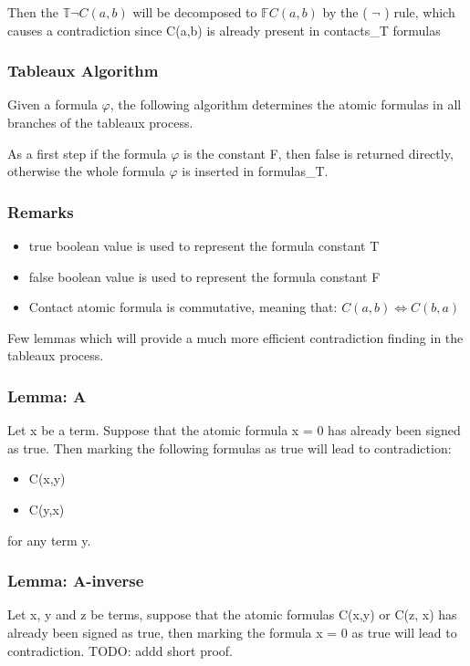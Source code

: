 \documentclass{article}
\begin{document}
			Then the $\mathbb{T}\neg C(a,b)$ will be decomposed to $\mathbb{F} C(a,b)$ by the ( $\neg$ ) rule, which causes a contradiction
			since C(a,b) is already present in contacts\_T formulas

		\subsubsection*{Tableaux Algorithm}
			Given a formula $\varphi$, the following algorithm determines the atomic formulas in all branches of the tableaux process.

			As a first step if the formula $\varphi$ is the constant F, then false is returned directly, otherwise the whole formula $\varphi$ is inserted in formulas\_T.
		\newline
			\subsubsection*{Remarks}
			\begin{itemize}
				\item true boolean value is used to represent the formula constant T
				\item false boolean value is used to represent the formula constant F
				\item Contact atomic formula is commutative, meaning that: $C(a,b) \iff C(b,a)$
			\end{itemize}
			Few lemmas which will provide a much more efficient contradiction finding in the tableaux process.
			\subsubsection*{Lemma: A}
				Let x be a term. Suppose that the atomic formula x = 0 has already been signed as true.
				Then marking the following formulas as true will lead to contradiction:
				\begin{itemize}
					\item C(x,y)
					\item C(y,x)
				\end{itemize}
				for any term y.

			\subsubsection*{Lemma: A-inverse}
				Let x, y and z be terms, suppose that the atomic formulas C(x,y) or C(z, x) has already been signed as true,
				then marking the formula x = 0 as true will lead to contradiction.
				\newline
				TODO: addd short proof.
\end{document}
